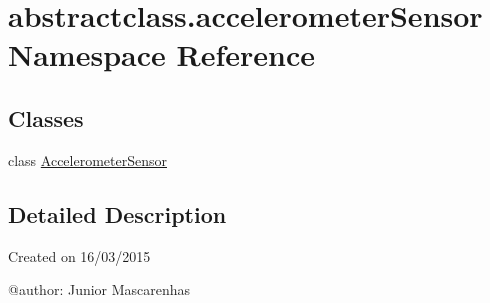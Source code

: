 \hypertarget{namespaceabstractclass_1_1accelerometerSensor}{}\section{abstractclass.\+accelerometer\+Sensor Namespace Reference}
\label{namespaceabstractclass_1_1accelerometerSensor}
\subsection*{Classes}
\begin{DoxyCompactItemize}
\item 
class \hyperlink{classabstractclass_1_1accelerometerSensor_1_1AccelerometerSensor}{Accelerometer\+Sensor}
\end{DoxyCompactItemize}


\subsection{Detailed Description}
\begin{DoxyVerb}Created on 16/03/2015

@author: Junior Mascarenhas
\end{DoxyVerb}
 